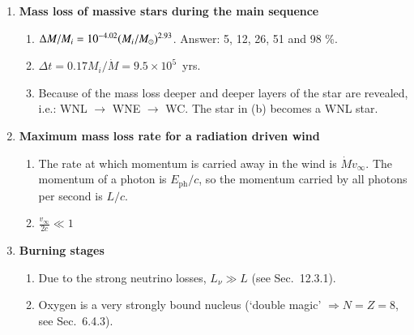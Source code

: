 \documentclass[11pt,a4paper,fleqn]{report}
\begin{document}

\begin{enumerate}

\item {\bf Mass loss of massive stars during the main sequence } 

  \begin {enumerate}    

  \item $\Delta M/M_i = 10^{-4.02} (M_i/{M}_\odot)^{2.93}$.  Answer: 5,
    12, 26, 51 and 98 \%.

  \item $\Delta t = 0.17 M_i/\dot{M} = 9.5\times 10^5$~yrs.

  \item Because of the mass loss deeper and deeper layers of the star
    are revealed, i.e.: WNL $\rightarrow$ WNE $\rightarrow$ WC. The
    star in (b) becomes a WNL star.

  \end {enumerate}  

\item {\bf Maximum mass loss rate for a radiation driven wind}

  \begin {enumerate}

  \item The rate at which momentum is carried away in the wind is
    $\dot{M} v_{\infty}$. The momentum of a photon is
    $E_\mathrm{ph}/c$, so the momentum carried by all photons per
    second is $L/c$.
   
  \item $\displaystyle \frac{v_{\infty}}{2 c} \ll 1$
    
  \end {enumerate}


\item {\bf Burning stages}

  \begin{enumerate}

  \item Due to the strong neutrino losses, $L_\nu \gg L$ (see
    Sec.~12.3.1).

  \item Oxygen is a very strongly bound nucleus (`double magic'
    $\Rightarrow N=Z=8$, see Sec.~6.4.3).

\end{enumerate}



\end{enumerate} 
\end{document}
